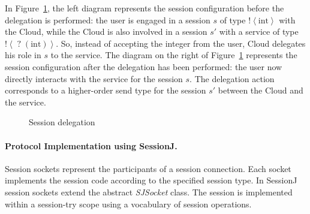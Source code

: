 \documentclass[10pt]{llncs}
\begin{document}
In Figure~\ref{fig:sj-delegation}, the left diagram represents the session configuration before the delegation is performed: the user is engaged in a session $s$ of type $\mathopen{!}\left<\text{int}\right>$ with the Cloud, while the Cloud is also involved in a session $s'$ with a service of type $\mathopen{!}\left<\mathopen{?}\left(\text{int}\right)\right>$. So, instead of accepting the integer from the user, Cloud delegates his role in $s$ to the service.
The diagram on the right of Figure~\ref{fig:sj-delegation} represents the session configuration after the delegation has been performed: the user now directly interacts with the service for the session $s$.
The delegation action corresponds to a higher-order send type for the session $s'$ between the Cloud and the service.
%
\begin{figure}[ht]
\centering
{}
\caption{Session delegation}\label{fig:sj-delegation}
\end{figure}

\paragraph{Protocol Implementation using SessionJ.}
Session sockets represent the participants of a session connection.
Each socket implements the session code according to the specified session type.
In SessionJ session sockets extend the abstract \textit{SJSocket} class. %
The session is implemented within a session-try scope using a vocabulary of session operations. %
\end{document}
